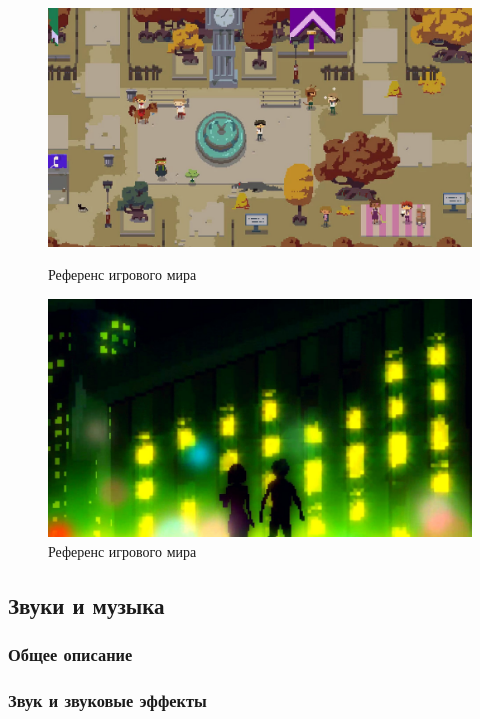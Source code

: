 \documentclass{article}
\begin{document}
	\begin{figure}[h]
		\begin{minipage}{0.4\textwidth}
			\centering
			\includegraphics[width=\textwidth]{images/park.jpg}
			\caption{Референс игрового мира}
			\label{fig:world1}
		\end{minipage} 
		\hfill
		\begin{minipage}{0.4\textwidth}
			\centering
			\includegraphics[width=\textwidth]{images/world.jpg}
			\caption{Референс игрового мира}
			\label{fig:world2}
		\end{minipage}
	\end{figure}
		
	\subsection{Звуки и музыка}
	
	\subsubsection{Общее описание}
	
	\subsubsection{Звук и звуковые эффекты}
	
\end{document}
